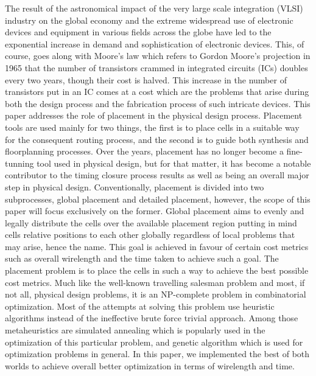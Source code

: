 \documentclass[conference]{IEEEtran}
\begin{document}
The result of the astronomical impact of the very large scale integration (VLSI) industry on the global economy and the extreme widespread use of electronic devices and equipment in various fields across the globe have led to the exponential increase in demand and sophistication of electronic devices. This, of course, goes along with Moore's law which refers to Gordon Moore's projection in 1965 that the number of transistors crammed in integrated circuits (ICs) doubles every two years, though their cost is halved. This increase in the number of transistors put in an IC comes at a cost which are the problems that arise during both the design process and the fabrication process of such intricate devices. This paper addresses the role of placement in the physical design process. Placement tools are used mainly for two things, the first is to place cells in a suitable way for the consequent routing process, and the second is to guide both synthesis and floorplanning processes. Over the years, placement has no longer become a fine-tunning tool used in physical design, but for that matter, it has become a notable contributor to the timing closure process results as well as being an overall major step in physical design. Conventionally, placement is divided into two subprocesses, global placement and detailed placement, however, the scope of this paper will focus exclusively on the former. Global placement aims to evenly and legally distribute the cells over the available placement region putting in mind cells relative positions to each other globally regardless of local problems that may arise, hence the name. This goal is achieved in favour of certain cost metrics such as overall wirelength and the time taken to achieve such a goal. The placement problem is to place the cells in such a way to achieve the best possible cost metrics. Much like the well-known travelling salesman problem and most, if not all, physical design problems, it is an NP-complete problem in combinatorial optimization. Most of the attempts at solving this problem use heuristic algorithms instead of the ineffective brute force trivial approach. Among those metaheuristics are simulated annealing which is popularly used in the optimization of this particular problem, and genetic algorithm which is used for optimization problems in general. In this paper, we implemented the best of both worlds to achieve overall better optimization in terms of wirelength and time.

\end{document}
